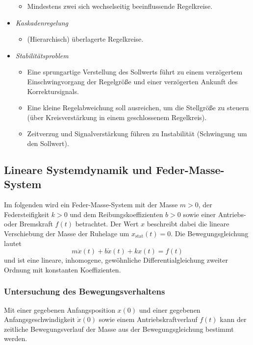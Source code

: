 \begin{itemize}
					\begin{itemize}
						\item Mindestens zwei sich wechselseitig beeinflussende Regelkreise.
					\end{itemize}
				\item \emph{Kaskadenregelung}
					\begin{itemize}
						\item (Hierarchisch) überlagerte Regelkreise.
					\end{itemize}
				\item \emph{Stabilitätsproblem}
					\begin{itemize}
						\item Eine sprungartige Verstellung des Sollwerts führt zu einem verzögertem Einschwingvorgang der Regelgröße und einer verzögerten Ankunft des Korrektursignals.
						\item Eine kleine Regelabweichung soll ausreichen, um die Stellgröße zu steuern (über Kreisverstärkung in einem geschlossenem Regelkreis).
						\item Zeitverzug und Signalverstärkung führen zu Instabilität (\dh Schwingung um den Sollwert).
					\end{itemize}
			\end{itemize}

		\subsection{Lineare Systemdynamik und Feder-Masse-System} %
			Im folgenden wird ein Feder-Masse-System mit der Masse \( m > 0 \), der Federsteifigkeit \( k > 0 \) und dem Reibungskoeffizienten \( b > 0 \) sowie einer Antriebs- oder Bremskraft \( f(t) \) betrachtet. Der Wert \( x \) beschreibt dabei die lineare Verschiebung der Masse \bzgl der Ruhelage um \( x_\text{stat}(t) = 0 \). Die Bewegungsgleichung lautet
			\begin{equation*}
				m\ddot{x}(t) + b\dot{x}(t) + kx(t) = f(t)
			\end{equation*}
			und ist eine lineare, inhomogene, gewöhnliche Differentialgleichung zweiter Ordnung mit konstanten Koeffizienten.

			\subsubsection{Untersuchung des Bewegungsverhaltens} %
				Mit einer gegebenen Anfangsposition \( x(0) \) und einer gegebenen Anfangsgeschwindigkeit \( \dot{x}(0) \) sowie einem Antriebskraftverlauf \( f(t) \) kann der zeitliche Bewegungsverlauf der Masse aus der Bewegungsgleichung bestimmt werden.
				
